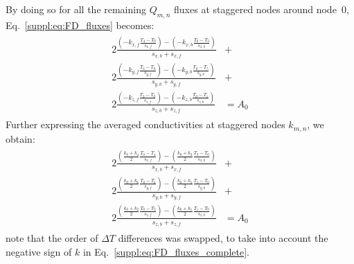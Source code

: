 By doing so for all the remaining $Q_{m,n}$ fluxes at staggered nodes around node~$0$, Eq.~\ref{suppl:eq:FD_fluxes} becomes:
\begin{align}
\begin{split}
    \label{suppl:eq:FD_fluxes_complete}
    2 \frac{
            \left( -k_{x,f} \displaystyle \frac{T_4 - T_0}{s_{x,f}} \right ) -
            \left( -k_{x,b} \displaystyle \frac{T_0 - T_3}{s_{x,b}} \right )
        }{s_{x,b} + s_{x,f}} &+ \\[1ex]
    2 \frac{
            \left( -k_{y,f} \displaystyle \frac{T_6 - T_0}{s_{y,f}} \right ) -
            \left( -k_{y,b} \displaystyle \frac{T_0 - T_5}{s_{y,b}} \right )
        }{s_{y,b} + s_{y,f}} &+ \\[1ex]
    2 \frac{
            \left( -k_{z,f} \displaystyle \frac{T_2 - T_0}{s_{z,f}} \right ) -
            \left( -k_{z,b} \displaystyle \frac{T_0 - T_1}{s_{z,b}} \right )
        }{s_{z,b} + s_{z,f}} &= A_0
\end{split}
\end{align}
Further expressing the averaged conductivities at staggered nodes $k_{m,n}$, we obtain:
\begin{align}
\begin{split}    
    \label{suppl:eq:FD_fluxes_complete_k}
    2 \frac{
            \left(
                \displaystyle \frac{k_0 + k_4}{2}
                \displaystyle \frac{T_0 - T_4}{s_{x,f}}
            \right ) -
            \left(
                \displaystyle \frac{k_0 + k_3}{2}
                \displaystyle \frac{T_3 - T_0}{s_{x,b}}
            \right )
        }{s_{x,b} + s_{x,f}} &+ \\[1ex]
    2 \frac{
            \left(
                \displaystyle \frac{k_0 + k_6}{2}
                \displaystyle \frac{T_0 - T_6}{s_{y,f}} \right ) -
            \left(
                \displaystyle \frac{k_0 + k_5}{2}
                \displaystyle \frac{T_5 - T_0}{s_{y,b}}
            \right )
        }{s_{y,b} + s_{y,f}} &+ \\[1ex]
    2 \frac{
            \left(
                \displaystyle \frac{k_0 + k_2}{2}
                \displaystyle \frac{T_0 - T_2}{s_{z,f}}
            \right ) -
            \left(
                \displaystyle \frac{k_0 + k_1}{2}
                \displaystyle \frac{T_1 - T_0}{s_{z,b}}
            \right )
        }{s_{z,b} + s_{z,f}} &= A_0
\end{split}
\end{align}
note that the order of $\Delta T$ differences was swapped, to take into account the negative sign of $k$ in Eq.~\ref{suppl:eq:FD_fluxes_complete}.

